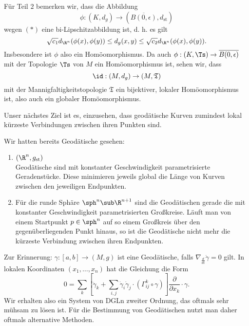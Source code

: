 \begin{beweis}
Für Teil $2$ bemerken wir, dass die Abbildung
\begin{equation}
\phi: (K, d_g) \to (\overline{B(0,\epsilon)}, d_\text{st})
\end{equation}
wegen $(\ast)$ eine bi-Lipschitzabbildung ist, d. h. es gilt
\begin{equation}
\sqrt{c_1} d_{\R^n} (\phi (x), \phi (y) ) \leq d_g(x,y) \leq \sqrt{c_2} d_{\R^n} (\phi(x), \phi(y)).
\end{equation}
Insbesondere ist $\phi$ also ein Homöomorphismus. Da auch $\phi: (K, \Ts) \to \overline{B(0,\epsilon)}$ mit der Topologie $\Ts$ von $M$ ein Homöomorphismus ist, sehen wir, dass 
\begin{equation}
\id: (M, d_g) \to (M, \mathfrak{T})
\end{equation}
mit der Mannigfaltigkeitstopologie $\mathfrak{T}$ ein bijektiver, lokaler Homöomorphismus ist, also auch ein globaler Homöomorphismus.
\end{beweis}
Unser nächstes Ziel ist es, einzusehen, dass geodätische Kurven zumindest lokal kürzeste Verbindungen zwischen ihren Punkten sind.
\begin{beispiele}
Wir hatten bereits Geodätische gesehen:
\begin{enumerate}
\item $(\R^n, g_\text{st})$\\
Geodätische sind mit konstanter Geschwindigkeit parametrisierte Geradenstücke. Diese minimieren jeweils global die Länge von Kurven zwischen den jeweiligen Endpunkten.
\item Für die runde Sphäre $\sph^n \sub \R^{n+1}$ sind die Geodätischen gerade die mit konstanter Geschwindigkeit parametrisierten Großkreise. Läuft man von einem Startpunkt $p \in \sph^n$ auf so einem Großkreis über den gegenüberliegenden Punkt hinaus, so ist die Geodätische nicht mehr die kürzeste Verbindung zwischen ihren Endpunkten.
\end{enumerate}
\end{beispiele}
Zur Erinnerung: $\gamma: [a,b] \to (M,g)$ ist eine Geodätische, falls $\nabla_\frac{d}{dt} \dot{\gamma} = 0$ gilt. In lokalen Koordinaten $(x_1, \dots, x_n)$ hat die Gleichung die Form
\begin{equation}
0 = \sum_k \left[\ddot{\gamma}_k + \sum_{i,j} \dot{\gamma}_i \dot{\gamma}_j \cdot (\Gamma^k_{ij} \circ \gamma) \right] \frac{\partial}{\partial x_k} \cdot \gamma.
\end{equation}
Wir erhalten also ein System von DGLn zweiter Ordnung, das oftmals sehr mühsam zu lösen ist. Für die Bestimmung von Geodätischen nutzt man daher oftmals alternative Methoden.
